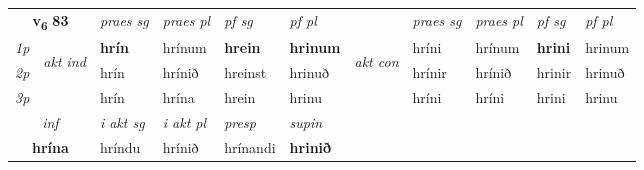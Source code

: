 \noindent
\begin{tabular}{lllllllllll} \toprule
\multicolumn{2}{c}{\textbf{v{\textsubscript{6}}} \Large{\textbf{83}}}  &  \textit{praes sg}  & \textit{praes pl}  &\textit{ pf sg} & \textit{pf pl} &  &  \textit{praes sg}  & \textit{praes pl}  & \textit{pf sg} & \textit{pf pl } \\*
	\cmidrule{3-6} \cmidrule{8-11}
 {\textit{1p}} & \multirow{3}{*}{\begin{turn}{90}\textit{akt ind}\end{turn}} & \textbf{hrín} & hrínum & \textbf{hrein} & \textbf{hrinum} & \multirow{3}{*}{\begin{turn}{90}\textit{akt con}\end{turn}} &hríni & hrínum & \textbf{hrini} & hrinum\\*
 {\textit{2p}} &  &  hrín  & hrínið & hreinst & hrinuð & & hrínir & hrínið & hrinir & hrinuð \\*
{\textit{3p}} &  & hrín & hrína & hrein & hrinu & & hríni & hríni& hrini & hrinu \\*
\cmidrule{3-6} \cmidrule{8-11}

   \multicolumn{2}{c}{\textit{inf}}  & \textit{i akt sg} & \textit{i akt pl}   & \textit{presp} & \textit{supin}   \\*
  \multicolumn{2}{c}{\textbf{hrína}} & hríndu  & hrínið   & hrínandi &  \textbf{hrinið}   \\*
\end{tabular}


